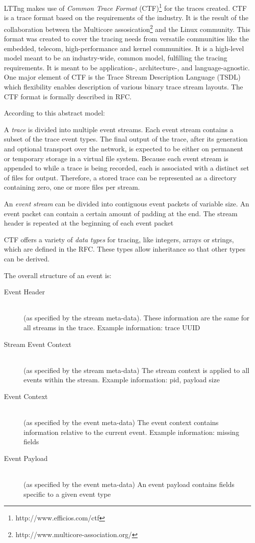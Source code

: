 LTTng makes use of \textit{Common Trace Format}
(CTF)\footnote{http://www.efficios.com/ctf} for the traces created. CTF is a
trace format based on the requirements of the industry. It is the result of the
collaboration between the Multicore
assosication\footnote{http://www.multicore-association.org/} and the Linux
community. This format was created to cover the tracing needs from versatile
communities like the embedded, telecom, high-performance and kernel communities.
It is a  high-level model meant to be an industry-wide, common model, fulfilling
the tracing requirements. It is meant to be application-, architecture-, and
language-agnostic. One major element of CTF is the Trace Stream Description
Language (TSDL) which flexibility enables description of various binary trace
stream layouts. The CTF format is formally described in RFC.

According to this abstract model:

A \textit{trace} is divided into multiple event streams. Each event stream
contains a subset of the trace event types. The final output of the trace, after
its generation and optional transport over the network, is expected to be either
on permanent or temporary storage in a virtual file system. Because each event
stream is appended to while a trace is being recorded, each is associated with a
distinct set of files for output. Therefore, a stored trace can be represented
as a directory containing zero, one or more files per stream.

An \textit{event stream} can be divided into contiguous event packets of
variable size. An event packet can contain a certain amount of padding at the
end. The stream header is repeated at the beginning of each event packet

CTF offers a variety of \textit{data types} for tracing, like integers, arrays
or strings, which are defined in the RFC. Τhese types allow inheritance so
that other types can be derived. 

The overall structure of an event is:

\begin{description}
\item[Event Header] \hfill \\
(as specified by the stream meta-data). These information are the same for all
streams in the trace. Example information: trace UUID
\item[Stream Event Context] \hfill \\ 
(as specified by the stream meta-data) The stream context is applied to all
events within the stream. Example information: pid, payload size
\item[Event Context] \hfill \\
(as specified by the event meta-data) The event context contains information
relative to the current event. Example information: missing fields
\item[Event Payload] \hfill \\
(as specified by the event meta-data) An event payload contains fields specific
to a given event type
\end{description}

